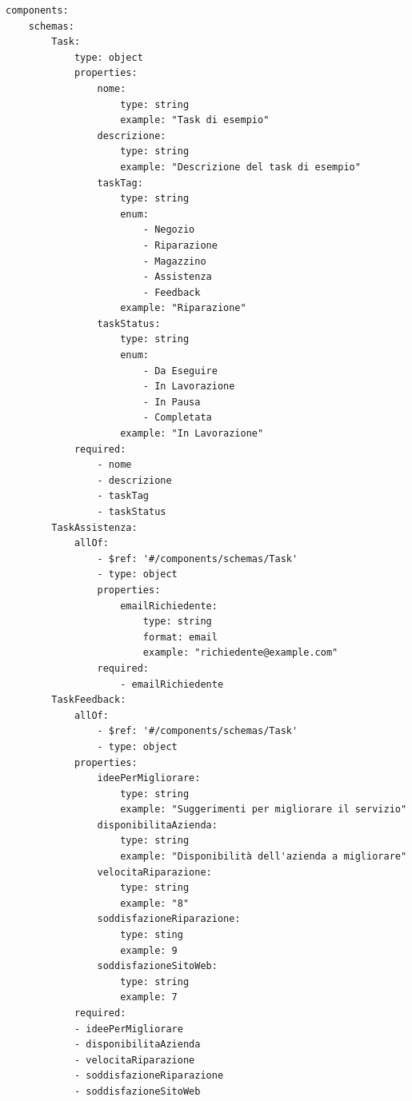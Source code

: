 \documentclass{report}
\begin{document}
\begin{verbatim}
components:
	schemas:
	    Task:
	        type: object
	        properties:
	            nome:
	                type: string
	                example: "Task di esempio"
	            descrizione:
	                type: string
	                example: "Descrizione del task di esempio"
	            taskTag:
	                type: string
	                enum:
	                    - Negozio
	                    - Riparazione
	                    - Magazzino
	                    - Assistenza
	                    - Feedback
	                example: "Riparazione"
	            taskStatus:
	                type: string
	                enum:
	                    - Da Eseguire
	                    - In Lavorazione
	                    - In Pausa
	                    - Completata
	                example: "In Lavorazione"
	        required:
	            - nome
	            - descrizione
	            - taskTag
	            - taskStatus
	    TaskAssistenza:
	        allOf:
	            - $ref: '#/components/schemas/Task'
	            - type: object
	            properties:
	                emailRichiedente:
	                    type: string
	                    format: email
	                    example: "richiedente@example.com"
	            required:
	                - emailRichiedente
	    TaskFeedback:
	        allOf:
	            - $ref: '#/components/schemas/Task'
	            - type: object
	        properties:
	            ideePerMigliorare:
	                type: string
	                example: "Suggerimenti per migliorare il servizio"
	            disponibilitaAzienda:
	                type: string
	                example: "Disponibilità dell'azienda a migliorare"
	            velocitaRiparazione:
	                type: string
	                example: "8"
	            soddisfazioneRiparazione:
	                type: sting
	                example: 9
	            soddisfazioneSitoWeb:
	                type: string
	                example: 7
	        required:
	        - ideePerMigliorare
	        - disponibilitaAzienda
	        - velocitaRiparazione
	        - soddisfazioneRiparazione
	        - soddisfazioneSitoWeb
	   

\end{verbatim}
\end{document}
